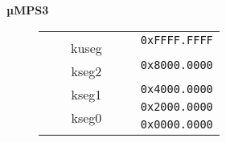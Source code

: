 \documentclass{beamer}
\begin{document}
\begin{frame}
\begin{center}
\begin{minipage}{0.45\textwidth}
\begin{block}{\textbf{µMPS3}}
\begin{figure}[h]
					\begin{tabular}{cl}
						\multicolumn{1}{c}{}                                          & \multirow{2}{*}{\texttt{{\tiny 0xFFFF.FFFF}}} \\ \cline{1-1}
						\multicolumn{1}{|c|}{\multirow{4}{*}{{\small ~~~~kuseg~~~~}}} &                                               \\
						\multicolumn{1}{|c|}{}                                        & \multirow{2}{*}{}                             \\
						\multicolumn{1}{|c|}{}                                        &                                               \\
						\multicolumn{1}{|c|}{}                                        & \multirow{2}{*}{\texttt{{\tiny 0x8000.0000}}} \\ \cline{1-1}
						\multicolumn{1}{|c|}{\multirow{4}{*}{{\small kseg2}}}         &                                               \\
						\multicolumn{1}{|c|}{}                                        & \multirow{2}{*}{}                             \\
						\multicolumn{1}{|c|}{}                                        &                                               \\
						\multicolumn{1}{|c|}{}                                        & \multirow{2}{*}{\texttt{{\tiny 0x4000.0000}}} \\ \cline{1-1}
						\multicolumn{1}{|c|}{\multirow{2}{*}{{\small kseg1}}}         &                                               \\
						\multicolumn{1}{|c|}{}                                        & \multirow{2}{*}{\texttt{{\tiny 0x2000.0000}}} \\ \cline{1-1}
						\multicolumn{1}{|c|}{\multirow{2}{*}{{\small kseg0}}}         &                                               \\
						\multicolumn{1}{|c|}{}                                        & \multirow{2}{*}{\texttt{{\tiny 0x0000.0000}}} \\ \cline{1-1}
						\multicolumn{1}{l}{}                                          &
					\end{tabular}
				\end{figure}
			\end{block}
		\end{minipage}
	\end{center}
\end{frame}
\end{document}
